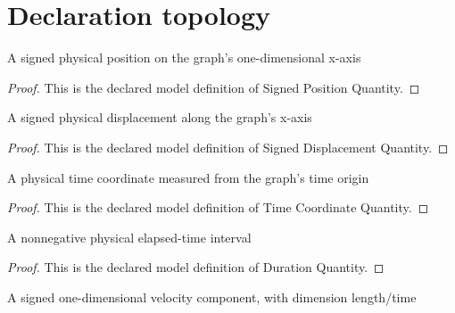 \section{Declaration topology}
\begin{definition}
  \label{def:physics:phyx-mini-0829:phyxminiproblems-problemphyxmini0829-signedpositionquantity}
  A signed physical position on the graph's one-dimensional x-axis
\end{definition}
\begin{proof}
  This is the declared model definition of Signed Position Quantity.
\end{proof}
\begin{definition}
  \label{def:physics:phyx-mini-0829:phyxminiproblems-problemphyxmini0829-signeddisplacementquantity}
  A signed physical displacement along the graph's x-axis
\end{definition}
\begin{proof}
  This is the declared model definition of Signed Displacement Quantity.
\end{proof}
\begin{definition}
  \label{def:physics:phyx-mini-0829:phyxminiproblems-problemphyxmini0829-timecoordinatequantity}
  A physical time coordinate measured from the graph's time origin
\end{definition}
\begin{proof}
  This is the declared model definition of Time Coordinate Quantity.
\end{proof}
\begin{definition}
  \label{def:physics:phyx-mini-0829:phyxminiproblems-problemphyxmini0829-durationquantity}
  A nonnegative physical elapsed-time interval
\end{definition}
\begin{proof}
  This is the declared model definition of Duration Quantity.
\end{proof}
\begin{definition}
  \label{def:physics:phyx-mini-0829:phyxminiproblems-problemphyxmini0829-signedvelocityquantity}
  A signed one-dimensional velocity component, with dimension length/time
\end{definition}

